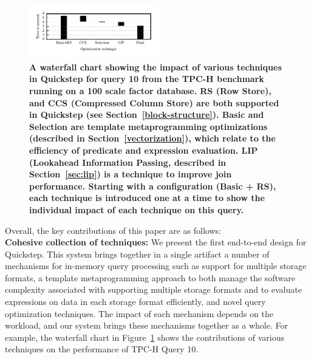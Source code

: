 
\begin{figure}
	\centering
	\includegraphics[width=0.5\textwidth]{system/figures/tpch-q10-waterfall.pdf}
	\caption{\textbf{A waterfall chart showing the impact of various techniques in Quickstep for query 10 from the TPC-H benchmark running on a 100 scale factor database. RS (Row Store), and CCS (Compressed Column Store) are both supported in Quickstep (see Section~\ref{block-structure}). Basic and Selection are template metaprogramming optimizations (described in Section~\ref{vectorization}), which relate to the efficiency of predicate and expression evaluation. LIP (Lookahead Information Passing, described in Section~\ref{sec:lip}) is a technique to improve join performance. Starting with a configuration (Basic + RS), each technique is introduced one at a time to show the individual impact of each technique on this query.}}
	\label{fig:tpch-q10-waterfall}
\end{figure}

Overall, the key contributions of this paper are as follows:\\
\textbf{Cohesive collection of techniques:} We present the first end-to-end design for Quickstep. This system brings together in a single artifact a number of mechanisms for in-memory query processing such as support for multiple storage formats, a template metaprogramming approach to both manage the software complexity associated with supporting multiple storage formats and to evaluate expressions on data in each storage format efficiently, and novel query optimization techniques.
The impact of each mechanism depends on the workload, and our system brings these mechanisms together as a whole.
For example, the waterfall chart in Figure~\ref{fig:tpch-q10-waterfall} shows the contributions of various techniques on the performance of TPC-H Query 10.

